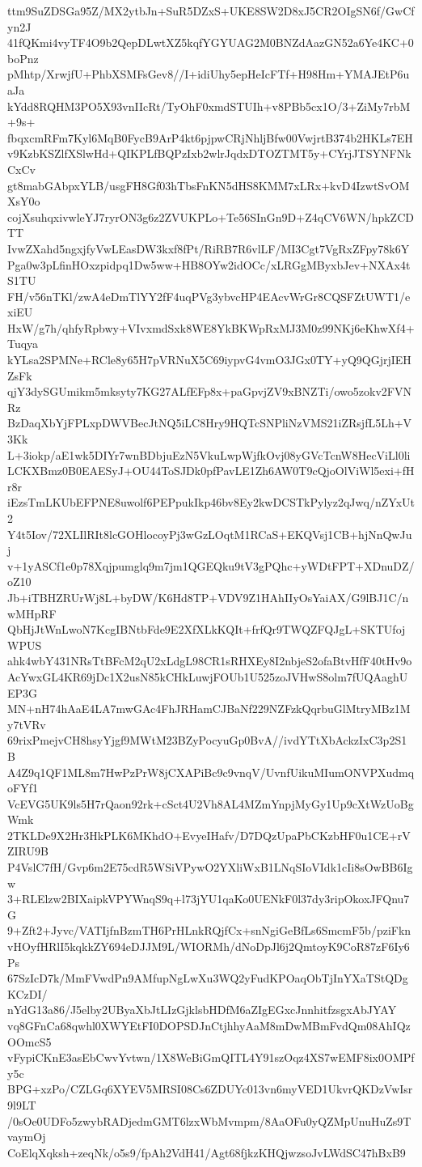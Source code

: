 ttm9SuZDSGa95Z/MX2ytbJn+SuR5DZxS+UKE8SW2D8xJ5CR2OIgSN6f/GwCfyn2J
41fQKmi4vyTF4O9b2QepDLwtXZ5kqfYGYUAG2M0BNZdAazGN52a6Ye4KC+0boPnz
pMhtp/XrwjfU+PhbXSMFsGev8//I+idiUhy5epHeIcFTf+H98Hm+YMAJEtP6uaJa
kYdd8RQHM3PO5X93vnIIcRt/TyOhF0xmdSTUIh+v8PBb5cx1O/3+ZiMy7rbM+9s+
fbqxcmRFm7Kyl6MqB0FycB9ArP4kt6pjpwCRjNhljBfw00VwjrtB374b2HKLs7EH
v9KzbKSZlfXSlwHd+QIKPLfBQPzIxb2wlrJqdxDTOZTMT5y+CYrjJTSYNFNkCxCv
gt8mabGAbpxYLB/usgFH8Gf03hTbsFnKN5dHS8KMM7xLRx+kvD4IzwtSvOMXsY0o
cojXsuhqxivwleYJ7ryrON3g6z2ZVUKPLo+Te56SInGn9D+Z4qCV6WN/hpkZCDTT
IvwZXahd5ngxjfyVwLEasDW3kxf8fPt/RiRB7R6vlLF/MI3Cgt7VgRxZFpy78k6Y
Pga0w3pLfinHOxzpidpq1Dw5ww+HB8OYw2idOCc/xLRGgMByxbJev+NXAx4tS1TU
FH/v56nTKl/zwA4eDmTlYY2fF4uqPVg3ybvcHP4EAcvWrGr8CQSFZtUWT1/exiEU
HxW/g7h/qhfyRpbwy+VIvxmdSxk8WE8YkBKWpRxMJ3M0z99NKj6eKhwXf4+Tuqya
kYLsa2SPMNe+RCle8y65H7pVRNuX5C69iypvG4vmO3JGx0TY+yQ9QGjrjIEHZsFk
qjY3dySGUmikm5mksyty7KG27ALfEFp8x+paGpvjZV9xBNZTi/owo5zokv2FVNRz
BzDaqXbYjFPLxpDWVBecJtNQ5iLC8Hry9HQTcSNPliNzVMS21iZRsjfL5Lh+V3Kk
L+3iokp/aE1wk5DIYr7wnBDbjuEzN5VkuLwpWjfkOvj08yGVcTcnW8HecViLl0li
LCKXBmz0B0EAESyJ+OU44ToSJDk0pfPavLE1Zh6AW0T9cQjoOlViWl5exi+fHr8r
iEzsTmLKUbEFPNE8uwolf6PEPpukIkp46bv8Ey2kwDCSTkPylyz2qJwq/nZYxUt2
Y4t5Iov/72XLIlRIt8lcGOHlocoyPj3wGzLOqtM1RCaS+EKQVsj1CB+hjNnQwJuj
v+1yASCf1e0p78Xqjpumglq9m7jm1QGEQku9tV3gPQhc+yWDtFPT+XDnuDZ/oZ10
Jb+iTBHZRUrWj8L+byDW/K6Hd8TP+VDV9Z1HAhIIyOsYaiAX/G9lBJ1C/nwMHpRF
QbHjJtWnLwoN7KcgIBNtbFde9E2XfXLkKQIt+frfQr9TWQZFQJgL+SKTUfojWPUS
ahk4wbY431NRsTtBFcM2qU2xLdgL98CR1sRHXEy8I2nbjeS2ofaBtvHfF40tHv9o
AcYwxGL4KR69jDc1X2usN85kCHkLuwjFOUb1U525zoJVHwS8olm7fUQAaghUEP3G
MN+nH74hAaE4LA7mwGAc4FhJRHamCJBaNf229NZFzkQqrbuGlMtryMBz1My7tVRv
69rixPmejvCH8hsyYjgf9MWtM23BZyPocyuGp0BvA//ivdYTtXbAckzIxC3p2S1B
A4Z9q1QF1ML8m7HwPzPrW8jCXAPiBc9c9vnqV/UvnfUikuMIumONVPXudmqoFYf1
VcEVG5UK9ls5H7rQaon92rk+cSct4U2Vh8AL4MZmYnpjMyGy1Up9cXtWzUoBgWmk
2TKLDe9X2Hr3HkPLK6MKhdO+EvyeIHafv/D7DQzUpaPbCKzbHF0u1CE+rVZIRU9B
P4VslC7fH/Gvp6m2E75cdR5WSiVPywO2YXliWxB1LNqSIoVIdk1cIi8sOwBB6Igw
3+RLElzw2BIXaipkVPYWnqS9q+l73jYU1qaKo0UENkF0l37dy3ripOkoxJFQnu7G
9+Zft2+Jyvc/VATIjfnBzmTH6PrHLnkRQjfCx+snNgiGeBfLs6SmcmF5b/pziFkn
vHOyfHRlI5kqkkZY694eDJJM9L/WIORMh/dNoDpJl6j2QmtoyK9CoR87zF6Iy6Ps
67SzIcD7k/MmFVwdPn9AMfupNgLwXu3WQ2yFudKPOaqObTjInYXaTStQDgKCzDI/
nYdG13a86/J5elby2UByaXbJtLIzGjklsbHDfM6aZIgEGxcJnnhitfzsgxAbJYAY
vq8GFnCa68qwhl0XWYEtFI0DOPSDJnCtjhhyAaM8mDwMBmFvdQm08AhIQzOOmcS5
vFypiCKnE3asEbCwvYvtwn/1X8WeBiGmQITL4Y91szOqz4XS7wEMF8ix0OMPfy5c
BPG+xzPo/CZLGq6XYEV5MRSI08Cs6ZDUYc013vn6myVED1UkvrQKDzVwIsr9l9LT
/0sOe0UDFo5zwybRADjedmGMT6lzxWbMvmpm/8AaOFu0yQZMpUnuHuZs9TvaymOj
CoElqXqksh+zeqNk/o5s9/fpAh2VdH41/Agt68fjkzKHQjwzsoJvLWdSC47hBxB9
